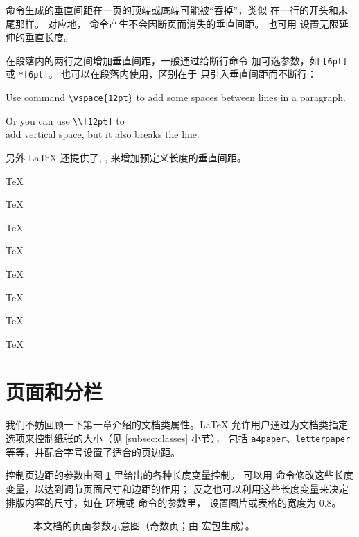  命令生成的垂直间距在一页的顶端或底端可能被“吞掉”，类似  在一行的开头和末尾那样。
对应地， 命令产生不会因断页而消失的垂直间距。 也可用  设置无限延伸的垂直长度。

在段落内的两行之间增加垂直间距，一般通过给断行命令 \crcmd{} 加可选参数，如 \crcmd\texttt{[6pt]} 或 \crcmd\texttt{*[6pt]}。
 也可以在段落内使用，区别在于  只引入垂直间距而不断行：
\begin{example}
Use command \verb|\vspace{12pt}|
to add \vspace{12pt} some spaces
between lines in a paragraph.

Or you can use \verb|\\[12pt]|
to \\[12pt] add vertical space,
but it also breaks the line.
\end{example}

另外 \LaTeX{} 还提供了, ,  来增加预定义长度的垂直间距。
\begin{example}
\parbox[t]{3em}{TeX\par TeX}
\parbox[t]{3em}{TeX\par\smallskip TeX}
\parbox[t]{3em}{TeX\par\medskip TeX}
\parbox[t]{3em}{TeX\par\bigskip TeX}
\end{example}

\section{页面和分栏}\label{sec:page-columns}

我们不妨回顾一下第一章介绍的文档类属性。\LaTeX{} 允许用户通过为文档类指定选项来控制纸张的大小（见 \ref{subsec:classes} 小节），
包括 \texttt{a4paper}、\texttt{letterpaper}等等，并配合字号设置了适合的页边距。

控制页边距的参数由图 \ref{fig:layouts} 里给出的各种长度变量控制。
可以用  命令修改这些长度变量，以达到调节页面尺寸和边距的作用；
反之也可以利用这些长度变量来决定排版内容的尺寸，如在  环境或  命令的参数里，
设置图片或表格的宽度为 0.8。

\begin{figure}[!p]
\centering
\layoutpicture*
\caption{本文档的页面参数示意图（奇数页；由  宏包生成）。} \label{fig:layouts}
\end{figure}

